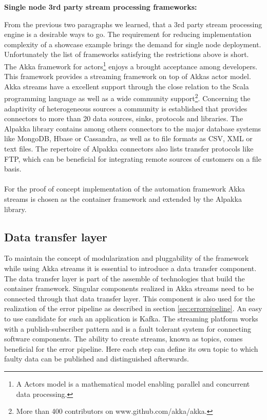 \textbf{Single node 3rd party stream processing frameworks:}

\noindent From the previous two paragraphs we learned, that a 3rd party stream processing engine is a desirable ways to go. The requirement for reducing implementation complexity of a showcase example brings the demand for single node deployment. Unfortunately the list of frameworks satisfying the restrictions above is short. The Akka framework for actors\footnote{A Actors model is a mathematical model enabling parallel and concurrent data processing.} \cite{akka_2017} enjoys a brought acceptance among developers. This framework provides a streaming framework on top of Akkas actor model. Akka streams \cite{akka_streams_2017} have a excellent support through the close relation to the Scala programming language as well as a wide community support\footnote{More than 400 contributors on www.github.com/akka/akka.}. Concerning the adaptivity of heterogeneous sources a community is established that provides connectors to more than 20 data sources, sinks, protocols and libraries. The Alpakka library \cite{alpakka_2016} contains among others connectors to the major database systems like MongoDB, Hbase or Cassandra, as well as to file formats as CSV, XML or text files. The repertoire of Alpakka connectors also lists transfer protocols like FTP, which can be beneficial for integrating remote sources of customers on a file basis.
\\\\
For the proof of concept implementation of the automation framework Akka streams is chosen as the container framework and extended by the Alpakka library. 

\subsection{Data transfer layer}
To maintain the concept of modularization and pluggability of the framework while using Akka streams it is essential to introduce a data transfer component. The data transfer layer is part of the assemble of technologies that build the container framework. Singular components realized in Akka streams need to be connected through that data transfer layer. This component is also used for the realization of the error pipeline as described in section \ref{sec:errorpipeline}. An easy to use candidate for such an application is Kafka. The streaming platform works with a publish-subscriber pattern and is a fault tolerant system for connecting software components. The ability to create streams, known as topics, comes beneficial for the error pipeline. Here each step can define its own topic to which faulty data can be published and distinguished afterwards.

